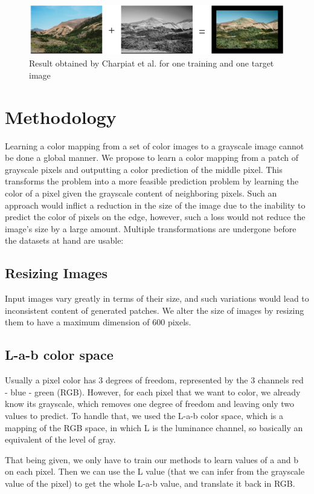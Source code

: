 \documentclass[10pt,twocolumn]{article}
\begin{document}
\begin{figure}[h]
\centering 
 \includegraphics[width=7.7 cm]{charpiatResult.png} 
\caption{\scriptsize Result obtained by Charpiat et al. for one training and one target image}
\label{fig:charpiat}
\end{figure} 


\section{Methodology}
Learning a color mapping from a set of color images to a grayscale image cannot be done a global manner. We propose to learn a color mapping from a patch of grayscale pixels and outputting a color prediction of the middle pixel. This transforms the problem into a more feasible prediction problem by learning the color of a pixel given the grayscale content of neighboring pixels. Such an approach would inflict a reduction in the size of the image due to the inability to predict the color of pixels on the edge, however, such a loss would not reduce the image's size by a large amount.
Multiple transformations are undergone before the datasets at hand are usable:

\subsection{Resizing Images}
Input images vary greatly in terms of their size, and such variations would lead to inconsistent content of generated patches. We alter the size of images by resizing them to have a maximum dimension of 600 pixels.

\subsection{L-a-b color space}
Usually a pixel color has 3 degrees of freedom, represented by the 3 channels red - blue - green (RGB). However, for each pixel that we want to color, we already know its grayscale, which removes one degree of freedom and leaving only two values to predict. To handle that, we used the L-a-b color space, which is a mapping of the RGB space, in which L is the luminance channel, so basically an equivalent of the level of gray. 

That being given, we only have to train our methods to learn values of a and b on each pixel. Then we can use the L value (that we can infer from the grayscale value of the pixel) to get the whole L-a-b value, and translate it back in RGB. 
\end{document}
